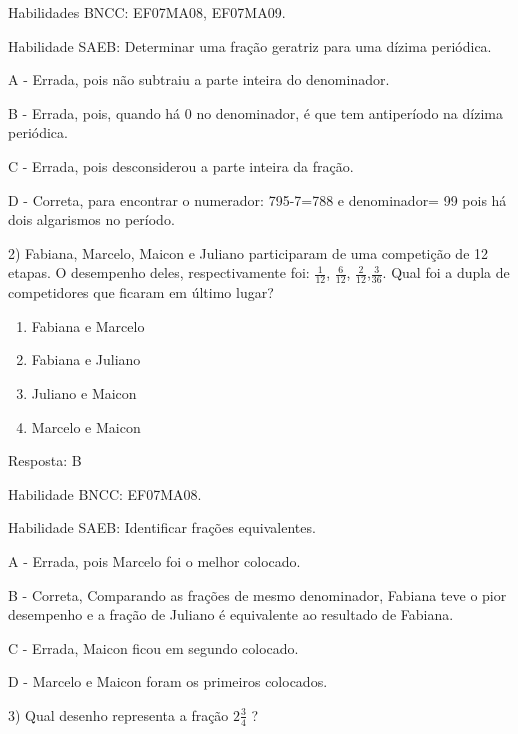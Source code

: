 Habilidades BNCC: EF07MA08, EF07MA09.

Habilidade SAEB: Determinar uma fração geratriz para uma dízima
periódica.

A - Errada, pois não subtraiu a parte inteira do denominador.

B - Errada, pois, quando há 0 no denominador, é que tem antiperíodo na
dízima periódica.

C - Errada, pois desconsiderou a parte inteira da fração.

D - Correta, para encontrar o numerador: 795-7=788 e denominador= 99
pois há dois algarismos no período.

2) Fabiana, Marcelo, Maicon e Juliano participaram de uma competição de
12 etapas. O desempenho deles, respectivamente foi: \(\frac{1}{12}\),
\(\frac{6}{12}\), \(\frac{2}{12}\),\(\frac{3}{36}\). Qual foi a dupla de
competidores que ficaram em último lugar?

\begin{enumerate}
\def\labelenumi{\alph{enumi})}
\item
  Fabiana e Marcelo
\item
  Fabiana e Juliano
\item
  Juliano e Maicon
\item
  Marcelo e Maicon
\end{enumerate}

Resposta: B

Habilidade BNCC: EF07MA08.

Habilidade SAEB: Identificar frações equivalentes.

A - Errada, pois Marcelo foi o melhor colocado.

B - Correta, Comparando as frações de mesmo denominador, Fabiana teve o
pior desempenho e a fração de Juliano é equivalente ao resultado de
Fabiana.

C - Errada, Maicon ficou em segundo colocado.

D - Marcelo e Maicon foram os primeiros colocados.

3) Qual desenho representa a fração \(2\frac{3}{4}\) ?

